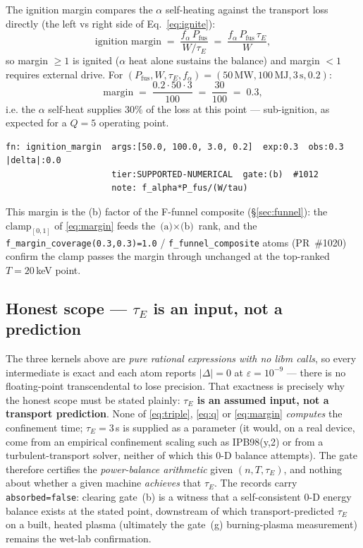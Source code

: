 The ignition margin compares the $\alpha$ self-heating against the transport
loss directly (the left vs right side of Eq.~\ref{eq:ignite}):
\begin{equation}
\text{ignition margin}
  \;=\;
  \frac{f_\alpha\,P_{\text{fus}}}{W/\tau_{\!E}}
  \;=\;
  \frac{f_\alpha\,P_{\text{fus}}\,\tau_{\!E}}{W},
\label{eq:margin}
\end{equation}
so margin $\ge 1$ is ignited ($\alpha$ heat alone sustains the balance) and
margin $<1$ requires external drive. For
$(P_{\text{fus}},W,\tau_{\!E},f_\alpha)=(50\,\text{MW},100\,\text{MJ},
3\,\text{s},0.2)$:
\begin{equation}
\text{margin} \;=\; \frac{0.2\cdot 50\cdot 3}{100} \;=\; \frac{30}{100} \;=\; 0.3,
\end{equation}
i.e. the $\alpha$ self-heat supplies $30\%$ of the loss at this point ---
sub-ignition, as expected for a $Q=5$ operating point.
\begin{lstlisting}
fn: ignition_margin  args:[50.0, 100.0, 3.0, 0.2]  exp:0.3  obs:0.3  |delta|:0.0
                     tier:SUPPORTED-NUMERICAL  gate:(b)  #1012
                     note: f_alpha*P_fus/(W/tau)
\end{lstlisting}

This margin is the (b) factor of the F-funnel composite (\S\ref{sec:funnel}):
the $\mathrm{clamp}_{[0,1]}$ of \eqref{eq:margin} feeds the $\text{(a)}\times
\text{(b)}$ rank, and the \verb|f_margin_coverage(0.3,0.3)=1.0| /
\verb|f_funnel_composite| atoms (PR~\#1020) confirm the clamp passes the
margin through unchanged at the top-ranked $T=20$\,keV point.

\subsection{Honest scope --- $\tau_{\!E}$ is an input, not a prediction}
\label{app:lawson-honest}

The three kernels above are \emph{pure rational expressions with no libm
calls}, so every intermediate is exact and each atom reports
$|\Delta|=0$ at $\varepsilon=10^{-9}$ --- there is no floating-point
transcendental to lose precision. That exactness is precisely why the honest
scope must be stated plainly: \textbf{$\tau_{\!E}$ is an assumed input, not a
transport prediction}. None of \eqref{eq:triple}, \eqref{eq:q} or
\eqref{eq:margin} \emph{computes} the confinement time; $\tau_{\!E}=3$\,s is
supplied as a parameter (it would, on a real device, come from an empirical
confinement scaling such as IPB98(y,2) or from a turbulent-transport
solver, neither of which this 0-D balance attempts). The gate therefore
certifies the \emph{power-balance arithmetic} given $(n,T,\tau_{\!E})$, and
nothing about whether a given machine \emph{achieves} that $\tau_{\!E}$. The
records carry \texttt{absorbed=false}: clearing gate~(b) is a witness that a
self-consistent 0-D energy balance exists at the stated point, downstream of
which transport-predicted $\tau_{\!E}$ on a built, heated plasma (ultimately
the gate~(g) burning-plasma measurement) remains the wet-lab confirmation.
